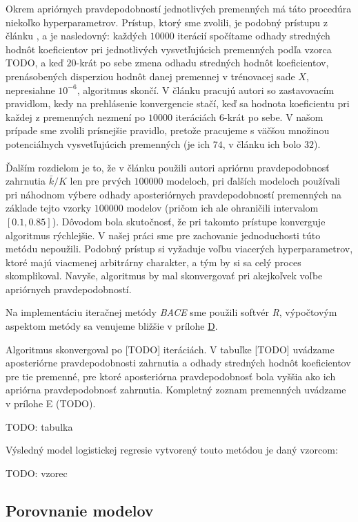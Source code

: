 Okrem apriórnych pravdepodobností jednotlivých premenných má táto procedúra niekoľko hyperparametrov.
Prístup, ktorý sme zvolili, je podobný prístupu z článku \cite{sala-i-martin}, a je nasledovný:
každých \(10000\) iterácií spočítame odhady stredných hodnôt koeficientov pri jednotlivých vysvetľujúcich premenných podľa vzorca TODO,
a keď \(20\)-krát po sebe zmena odhadu stredných hodnôt koeficientov, prenásobených disperziou hodnôt danej premennej v trénovacej sade \(X\),
nepresiahne \(10^{-6}\), algoritmus skončí.
V článku \cite{sala-i-martin} pracujú autori so zastavovacím pravidlom, kedy na prehlásenie konvergencie stačí,
keď sa hodnota koeficientu pri každej z premenných nezmení po \(10000\) iteráciách \(6\)-krát po sebe.
V našom prípade sme zvolili prísnejšie pravidlo, pretože pracujeme s väčšou množinou potenciálnych vysvetľujúcich premenných
(je ich \(74\), v článku \cite{sala-i-martin} ich bolo \(32\)).

Ďalším rozdielom je to, že v článku \cite{sala-i-martin} použili autori apriórnu pravdepodobnosť zahrnutia \( \bar{k}/K \) len pre prvých \(100000\) modeloch,
pri ďalších modeloch používali pri náhodnom výbere odhady aposteriórnych pravdepodobností premenných na základe tejto vzorky \(100000\) modelov
(pričom ich ale ohraničili intervalom \([0.1, 0.85]\)).
Dôvodom bola skutočnosť, že pri takomto prístupe konverguje algoritmus rýchlejšie.
V našej práci sme pre zachovanie jednoduchosti túto metódu nepoužili.
Podobný prístup si vyžaduje voľbu viacerých hyperparametrov, ktoré majú viacmenej arbitrárny charakter, a tým by si sa celý proces skomplikoval.
Navyše, algoritmus by mal skonvergovať pri akejkoľvek voľbe apriórnych pravdepodobností.

Na implementáciu iteračnej metódy \emph{BACE} sme použili softvér \emph{R}, výpočtovým aspektom metódy sa venujeme bližšie v prílohe \hyperref[appendix:d]{D}.

Algoritmus skonvergoval po [TODO] iteráciách.
V tabuľke [TODO] uvádzame aposteriórne pravdepodobnosti zahrnutia a odhady stredných hodnôt koeficientov pre tie premenné,
pre ktoré aposteriórna pravdepodobnosť bola vyššia ako ich apriórna pravdepodobnosť zahrnutia. Kompletný zoznam premenných uvádzame v prílohe E (TODO).

TODO: tabulka

Výsledný model logistickej regresie vytvorený touto metódou je daný vzorcom:

TODO: vzorec

\subsection{Porovnanie modelov}


